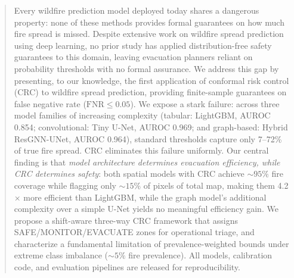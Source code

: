 \documentclass{article}
\begin{document}
\printAffiliationsAndNotice{}


\begin{abstract}
    Every wildfire prediction model deployed today shares a dangerous property: none of these methods provides formal guarantees on how much fire spread is missed.
    Despite extensive work on wildfire spread prediction using deep learning, no prior study has applied distribution-free safety guarantees to this domain, leaving evacuation planners reliant on probability thresholds with no formal assurance.
    We address this gap by presenting, to our knowledge, the first application of conformal risk control (CRC) \citep{angelopoulos2022conformal} to wildfire spread prediction, providing finite-sample guarantees on false negative rate ($\mathrm{FNR} \le 0.05$).
    We expose a stark failure: across three model families of increasing complexity (tabular: LightGBM, AUROC 0.854; convolutional: Tiny U-Net, AUROC 0.969; and graph-based: Hybrid ResGNN-UNet, AUROC 0.964), standard thresholds capture only 7--72\% of true fire spread.
    CRC eliminates this failure uniformly.
    Our central finding is that \emph{model architecture determines evacuation efficiency, while CRC determines safety}: both spatial models with CRC achieve ${\sim}95\%$ fire coverage while flagging only ${\sim}15\%$ of pixels of total map, making them 4.2$\times$ more efficient than LightGBM, while the graph model's additional complexity over a simple U-Net yields no meaningful efficiency gain.
    We propose a shift-aware three-way CRC framework that assigns SAFE/MONITOR/EVACUATE zones for operational triage, and characterize a fundamental limitation of prevalence-weighted bounds under extreme class imbalance (${\sim}5\%$ fire prevalence).
    All models, calibration code, and evaluation pipelines are released for reproducibility.
\end{abstract}
\end{document}
